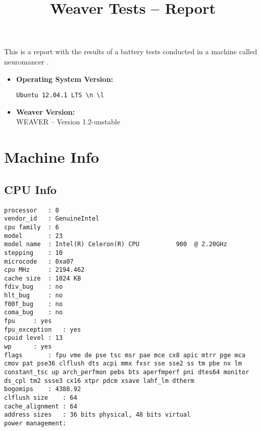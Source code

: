 \documentclass{article}
\title{Weaver Tests -- Report}
\begin{document}
\maketitle
This is a report with the results of a battery
tests conducted in a machine called 
neuromancer
.
\begin{itemize}
\item
\textbf{Operating System Version: }
\begin{verbatim}
Ubuntu 12.04.1 LTS \n \l

\end{verbatim}
\item
\textbf{Weaver Version: }\\
WEAVER -- Version 1.2-unstable
\end{itemize}
\section{Machine Info}
\subsection{CPU Info}
\begin{verbatim}
processor	: 0
vendor_id	: GenuineIntel
cpu family	: 6
model		: 23
model name	: Intel(R) Celeron(R) CPU          900  @ 2.20GHz
stepping	: 10
microcode	: 0xa07
cpu MHz		: 2194.462
cache size	: 1024 KB
fdiv_bug	: no
hlt_bug		: no
f00f_bug	: no
coma_bug	: no
fpu		: yes
fpu_exception	: yes
cpuid level	: 13
wp		: yes
flags		: fpu vme de pse tsc msr pae mce cx8 apic mtrr pge mca cmov pat pse36 clflush dts acpi mmx fxsr sse sse2 ss tm pbe nx lm constant_tsc up arch_perfmon pebs bts aperfmperf pni dtes64 monitor ds_cpl tm2 ssse3 cx16 xtpr pdcm xsave lahf_lm dtherm
bogomips	: 4388.92
clflush size	: 64
cache_alignment	: 64
address sizes	: 36 bits physical, 48 bits virtual
power management:

\end{verbatim}
\end{document}
